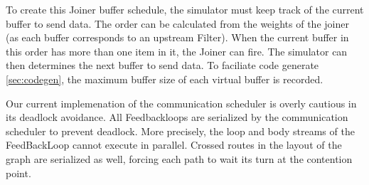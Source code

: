 To create this Joiner buffer schedule, the simulator must keep track
of the current buffer to send data.  The order can be
calculated from the weights of the joiner (as each buffer corresponds
to an upstream Filter).  When the current buffer in this order has
more than one item in it, the Joiner can fire.  The simulator can then
determines the next buffer to send data.  To faciliate code generate
\ref{sec:codegen}, the maximum buffer size of each virtual buffer is
recorded.

Our current implemenation of the communication scheduler is overly
cautious in its deadlock avoidance.  All Feedbackloops are serialized
by the communication scheduler to prevent deadlock.  More precisely, 
the loop and body streams of the FeedBackLoop cannot execute in
parallel.  Crossed routes in the layout of the graph are serialized as
well, forcing each path to wait its turn at the contention point.
